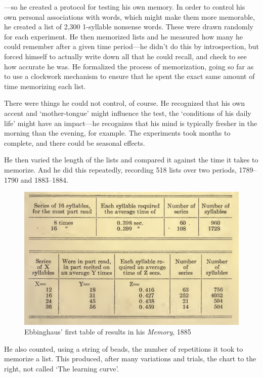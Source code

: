 \begin{refsection}
---so he created a protocol for testing his own memory. In order to control his own personal associations with words, which might make them more memorable, he created a list of 2,300 1-syllable nonsense words. These were drawn randomly for each experiment. He then memorized lists and he measured how many he could remember after a given time period---he didn't do this by introspection, but forced himself to actually write down all that he could recall, and check to see how accurate he was. He formalized the process of memorization, going so far as to use a clockwork mechanism to ensure that he spent the exact same amount of time memorizing each list.

There were things he could not control, of course. He recognized that his own accent and `mother-tongue' might influence the test, the `conditions of his daily life' might have an impact---he recognizes that his mind is typically fresher in the morning than the evening, for example. The experiments took months to complete, and there could be seasonal effects. 

He then varied the length of the lists and compared it against the time it takes to memorize. And he did this repeatedly, recording 518 lists over two periods, 1789--1790 and 1883--1884.
\begin{figure}\includegraphics{../images/ebbinghaus1885.png}\caption{Ebbinghaus' first table of results in his \emph{Memory}, 1885}\label{fig:ebbinghaus1}\end{figure}

He also counted, using a string of beads, the number of repetitions it took to memorize a list. This produced, after many variations and trials, the chart to the right, not called `The learning curve'.
\begin{marginfigure}
 \begin{center}


\end{center}
\end{marginfigure}
\end{refsection}
